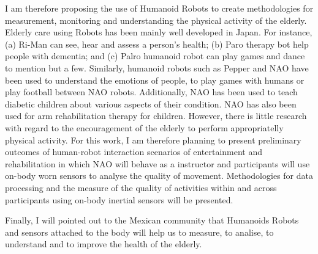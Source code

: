 \documentclass[12pt,journal,onecolumn,compsoc]{IEEEtran}
\begin{document}
I am therefore proposing the use of Humanoid Robots to 
create methodologies for measurement, monitoring and understanding the physical activity of the elderly.
Elderly care using Robots has been mainly well developed in Japan. For instance,
(a) Ri-Man can see, hear and assess a person's health; (b) Paro therapy bot help people with dementia; and 
(c) Palro humanoid robot can play games and dance to mention but a few.
Similarly, humanoid robots such as Pepper and NAO have been used to understand the emotions of people,
to play games with humans or play football between NAO robots.
Additionally, NAO has been used to teach diabetic children about various aspects of their condition.
NAO has also been used for arm rehabilitation therapy for children.
However, there is little research with regard to the encouragement of the elderly to 
perform appropriatelly physical activity.
For this work, I am therefore planning to present preliminary outcomes 
of human-robot interaction scenarios of entertainment and rehabilitation in which 
NAO will behave as a instructor and participants will use on-body worn sensors 
to analyse the quality of movement. 
Methodologies for data processing and the measure of the quality of activities 
within and across participants using on-body inertial sensors
will be presented.

Finally, I will pointed out to the Mexican community that 
Humanoids Robots and sensors attached to the body 
will help us to measure, to analise, to understand and to improve the health of the elderly.


\end{document}
